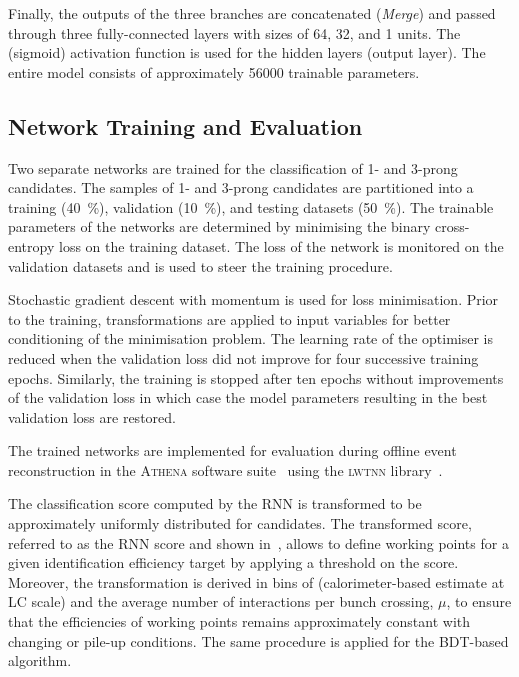 Finally, the outputs of the three branches are concatenated
(\emph{Merge}) and passed through three fully-connected layers with
sizes of 64, 32, and 1 units. The \ReLU (sigmoid) activation function
is used for the hidden layers (output layer). The entire model
consists of approximately \num{56000} trainable parameters.


\subsection{Network Training and Evaluation}

Two separate networks are trained for the classification of 1- and
3-prong \tauhadvis candidates. The samples of 1- and 3-prong
\tauhadvis candidates are partitioned into a training
(\SI{40}{\percent}), validation (\SI{10}{\percent}), and testing
datasets (\SI{50}{\percent}). The trainable parameters of the networks
are determined by minimising the binary cross-entropy loss on the
training dataset. The loss of the network is monitored on the
validation datasets and is used to steer the training procedure.

Stochastic gradient descent with momentum is used for loss
minimisation. Prior to the training, transformations are applied to
input variables for better conditioning of the minimisation
problem. The learning rate of the optimiser is reduced when the
validation loss did not improve for four successive training
epochs. Similarly, the training is stopped after ten epochs without
improvements of the validation loss in which case the model parameters
resulting in the best validation loss are restored.

The trained networks are implemented for evaluation during offline
event reconstruction in the \textsc{Athena} software
suite~\cite{ATL-SOFT-PUB-2021-001} using the \textsc{lwtnn}
library~\cite{lwtnn}.

The classification score computed by the RNN \tauid is transformed to
be approximately uniformly distributed for \truetauhadvis
candidates. The transformed score, referred to as the RNN score and
shown in~, allows to define working
points for a given \truetauhadvis identification efficiency target by
applying a threshold on the score. Moreover, the transformation is
derived in bins of \tauhadvis \pT (calorimeter-based \pT estimate at
LC scale) and the average number of interactions per bunch crossing,
$\mu$, to ensure that the \truetauhadvis efficiencies of working
points remains approximately constant with changing \tauhadvis \pT or
pile-up conditions. The same procedure is applied for the BDT-based
\tauid algorithm.

